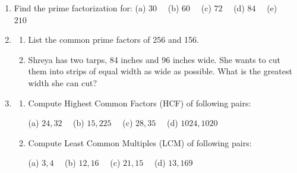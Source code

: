 \documentclass[a4paper,leqno,12pt]{amsart}
\begin{document}
\begin{enumerate}
\item Find the prime factorization for:
(a) $30 \quad$ (b) $60 \quad$ (c) $72 \quad$ (d) $84 \quad$ (e) $210 \quad$

\item
\begin{enumerate}
 \item List the common prime factors of 256 and 156.
 \item Shreya has two tarps, 84 inches and 96 inches wide. She wants to cut them into strips of equal width as wide as possible. 
 What is the greatest width she can cut?
\end{enumerate}

\item 
\begin{enumerate}
\item Compute Highest Common Factors (HCF) of following pairs:

	(a) $24, 32 \quad$ (b) $15, 225 \quad$  (c) $28, 35 \quad $ (d) $1024, 1020$
	
\item Compute Least Common Multiples (LCM) of following pairs:

	(a) $3, 4 \quad$ (b) $12, 16 \quad $ (c) $21, 15 \quad $ (d) $13, 169$ 
\end{enumerate}



\end{enumerate}


\end{document}
